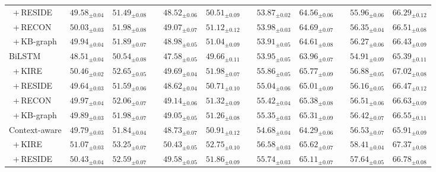 \documentclass[runningheads]{llncs}
\begin{document}
\begin{table}[!tb]
{\begin{tabular}{l|ccccccccccc}
		\ +\,RESIDE      & $49.58_{\pm 0.04}$ & $51.49_{\pm 0.08}$ & & $48.52_{\pm 0.06}$ & $50.51_{\pm 0.09}$ & & $53.87_{\pm 0.02}$ & $64.56_{\pm 0.06}$ & & $55.96_{\pm 0.06}$ & $66.29_{\pm 0.12}$ \\
		\ +\,RECON       & $50.03_{\pm 0.03}$ & $51.98_{\pm 0.08}$ & & $49.07_{\pm 0.07}$ & $51.12_{\pm 0.12}$ & & $53.98_{\pm 0.03}$ & $64.69_{\pm 0.07}$ & & $56.35_{\pm 0.04}$ & $66.51_{\pm 0.08}$ \\
		\ +\,KB-graph    & $49.94_{\pm 0.04}$ & $51.89_{\pm 0.07}$ & & $48.98_{\pm 0.05}$ & $51.04_{\pm 0.09}$ & & $53.91_{\pm 0.05}$ & $64.61_{\pm 0.08}$ & & $56.27_{\pm 0.06}$ & $66.43_{\pm 0.09}$ \\
		\hline 
		BiLSTM              & $48.51_{\pm 0.04}$ & $50.54_{\pm 0.08}$ & & $47.58_{\pm 0.05}$ & $49.66_{\pm 0.11}$ & & $53.95_{\pm 0.05}$ & $63.96_{\pm 0.07}$ & & $54.91_{\pm 0.09}$ & $65.39_{\pm 0.11}$ \\
		\ +\,KIRE        & $\mathbf{50.46}_{\pm 0.02}$ & $\mathbf{52.65}_{\pm 0.05}$ & & $\mathbf{49.69}_{\pm 0.04}$ & $\mathbf{51.98}_{\pm 0.07}$ & & $\mathbf{55.86}_{\pm 0.05}$ & $\mathbf{65.77}_{\pm 0.09}$ & & $\mathbf{56.88}_{\pm 0.05}$ & $\mathbf{67.02}_{\pm 0.08}$ \\
		\ +\,RESIDE      & $49.64_{\pm 0.03}$ & $51.59_{\pm 0.06}$ & & $48.62_{\pm 0.04}$ & $50.71_{\pm 0.10}$ & & $55.04_{\pm 0.06}$ & $65.01_{\pm 0.09}$ & & $56.16_{\pm 0.05}$ & $66.47_{\pm 0.12}$ \\
		\ +\,RECON       & $49.97_{\pm 0.04}$ & $52.06_{\pm 0.07}$ & & $49.14_{\pm 0.06}$ & $51.32_{\pm 0.09}$ & & $55.42_{\pm 0.04}$ & $65.38_{\pm 0.08}$ & & $56.51_{\pm 0.06}$ & $66.63_{\pm 0.09}$ \\
		\ +\,KB-graph    & $49.89_{\pm 0.03}$ & $51.98_{\pm 0.07}$ & & $49.05_{\pm 0.05}$ & $51.26_{\pm 0.08}$ & & $55.35_{\pm 0.03}$ & $65.31_{\pm 0.09}$ & & $56.42_{\pm 0.07}$ & $66.55_{\pm 0.11}$ \\
		\hline 
		Context-aware       & $49.79_{\pm 0.03}$ & $51.84_{\pm 0.04}$ & & $48.73_{\pm 0.07}$ & $50.91_{\pm 0.12}$ & & $54.68_{\pm 0.04}$ & $64.29_{\pm 0.06}$ & & $56.53_{\pm 0.07}$ & $65.91_{\pm 0.09}$ \\
		\ +\,KIRE        & $\mathbf{51.07}_{\pm 0.03}$ & $\mathbf{53.25}_{\pm 0.07}$ & & $\mathbf{50.43}_{\pm 0.05}$ & $\mathbf{52.75}_{\pm 0.10}$ & & $\mathbf{56.58}_{\pm 0.03}$ & $\mathbf{65.62}_{\pm 0.07}$ & & $\mathbf{58.41}_{\pm 0.04}$ & $\mathbf{67.37}_{\pm 0.08}$ \\
		\ +\,RESIDE      & $50.43_{\pm 0.04}$ & $52.59_{\pm 0.07}$ & & $49.58_{\pm 0.05}$ & $51.86_{\pm 0.09}$ & & $55.74_{\pm 0.03}$ & $65.11_{\pm 0.07}$ & & $57.64_{\pm 0.05}$ & $66.78_{\pm 0.08}$ \\

\end{tabular}}
\end{table}
\end{document}
